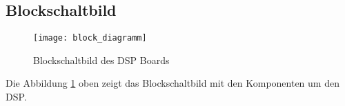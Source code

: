 \subsection{Blockschaltbild}
\label{sec:Blockschaltbild}

\begin{figure}[H]
	\centering
	\texttt{[image: block\_diagramm]}
	\caption{Blockschaltbild des DSP Boards}
	\label{pic:Blockdiagramm}
\end{figure}

Die Abbildung \ref{pic:Blockdiagramm} oben zeigt das Blockschaltbild mit den Komponenten um den DSP. 

